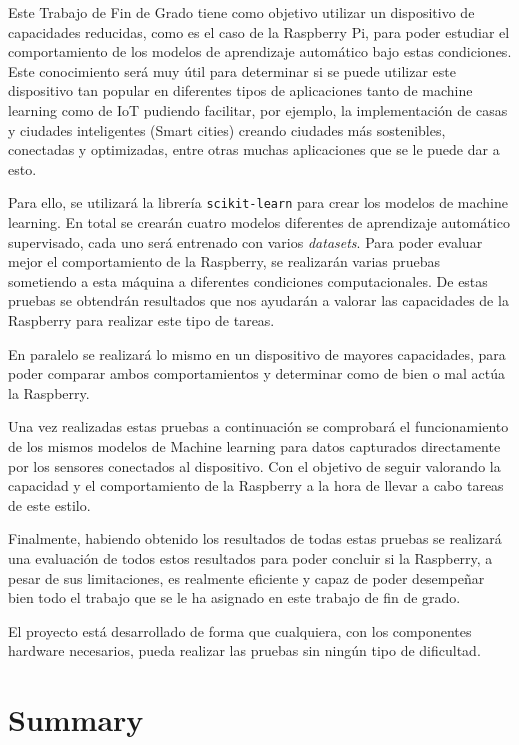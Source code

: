\documentclass[a4paper, 12pt]{book}
\begin{document}
Este Trabajo de Fin de Grado tiene como objetivo utilizar un dispositivo de capacidades reducidas, como es el caso de la Raspberry Pi, para poder estudiar el comportamiento de los modelos de aprendizaje automático bajo estas condiciones. Este conocimiento será muy útil para determinar si se puede utilizar este dispositivo tan popular en diferentes tipos de aplicaciones tanto de machine learning como de IoT pudiendo facilitar, por ejemplo, la implementación de casas y ciudades inteligentes (Smart cities) creando ciudades más sostenibles, conectadas y optimizadas, entre otras muchas aplicaciones que se le puede dar a esto.

Para ello, se utilizará la librería \texttt{scikit-learn} para crear los modelos de machine learning. En total se crearán cuatro modelos diferentes de aprendizaje automático supervisado, cada uno será entrenado con varios \textit{datasets}. Para poder evaluar mejor el comportamiento de la Raspberry, se realizarán varias pruebas sometiendo a esta máquina a diferentes condiciones computacionales. De estas pruebas se obtendrán resultados que nos ayudarán a valorar las capacidades de la Raspberry para realizar este tipo de tareas. 

En paralelo se realizará lo mismo en un dispositivo de mayores capacidades, para poder comparar ambos comportamientos y determinar como de bien o mal actúa la Raspberry.

Una vez realizadas estas pruebas a continuación se comprobará el funcionamiento de los mismos modelos de Machine learning para datos capturados directamente por los sensores conectados al dispositivo. Con el objetivo de seguir valorando la capacidad y el comportamiento de la Raspberry a la hora de llevar a cabo tareas de este estilo.

Finalmente, habiendo obtenido los resultados de todas estas pruebas se realizará una evaluación de todos estos resultados para poder concluir si la Raspberry, a pesar de sus limitaciones, es realmente eficiente y capaz de poder desempeñar bien todo el trabajo que se le ha asignado en este trabajo de fin de grado.

El proyecto está desarrollado de forma que cualquiera, con los componentes hardware necesarios, pueda realizar las pruebas sin ningún tipo de dificultad.



\chapter*{Summary}
\end{document}
